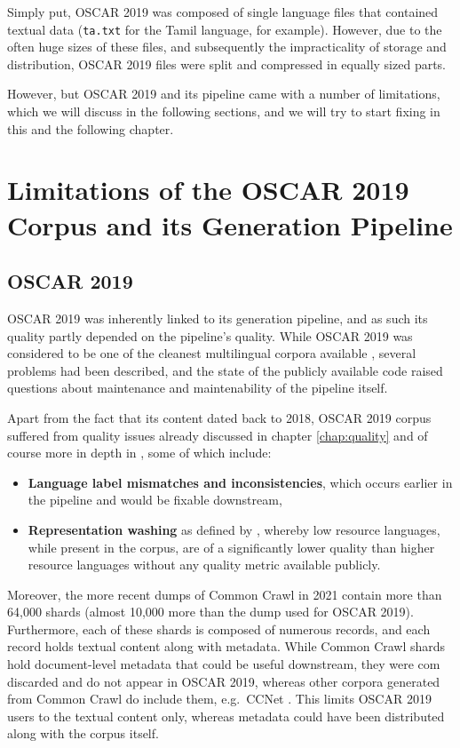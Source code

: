 Simply put, OSCAR 2019 was composed of single language files that contained textual data (\texttt{ta.txt} for the Tamil language, for example). However, due to the often huge sizes of these files, and subsequently the impracticality of storage and distribution, OSCAR 2019 files were split and compressed in equally sized parts.

However, but OSCAR 2019 and its pipeline came with a number of limitations, which we will discuss in the following sections, and we will try to start fixing in this and the following chapter.

\section{Limitations of the OSCAR 2019 Corpus and its Generation Pipeline}

\subsection{OSCAR 2019}

OSCAR 2019 was inherently linked to its generation pipeline, and as such its quality partly depended on the pipeline's quality. While OSCAR 2019 was considered to be one of the cleanest multilingual corpora available \citep{caswell-etal-2020-language,kreutzer-etal-2021-quality}, several problems had been described, and the state of the publicly available code raised questions about maintenance and maintenability of the pipeline itself.

Apart from the fact that its content dated back to 2018, OSCAR 2019 corpus suffered from quality issues already discussed in chapter \ref{chap:quality} and of course more in depth in \citep{caswell-etal-2020-language,kreutzer-etal-2021-quality}, some of which include:

\begin{itemize}
    \item \textbf{Language label mismatches and inconsistencies}, which occurs earlier in the pipeline and would be fixable downstream,
    \item \textbf{Representation washing} as defined by \citet{kreutzer-etal-2021-quality}, whereby low resource languages, while present in the corpus, are of a significantly lower quality than higher resource languages without any quality metric available publicly.
\end{itemize}

Moreover, the more recent dumps of Common Crawl in 2021 contain more than 64,000 shards (almost 10,000 more than the dump used for OSCAR 2019). Furthermore, each of these shards is composed of numerous records, and each record holds textual content along with metadata. While Common Crawl shards hold document-level metadata that could be useful downstream, they were com discarded and do not appear in OSCAR 2019, whereas other corpora generated from Common Crawl do include them, e.g.~CCNet \citep{wenzek-etal-2020-ccnet}. This limits OSCAR 2019 users to the textual content only, whereas metadata could have been distributed along with the corpus itself.

